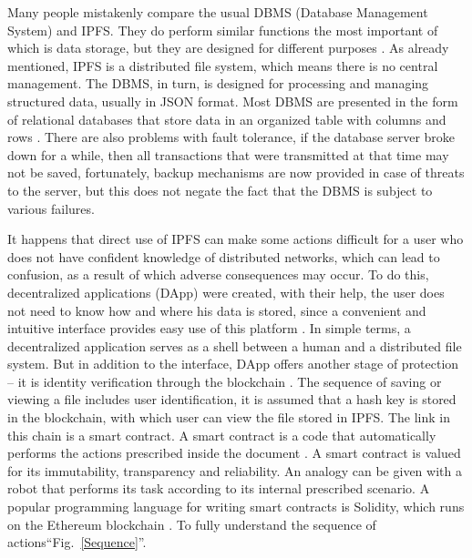 \documentclass[10pt,conference,a4paper]{IEEEtran_EDM}
\begin{document}
Many people mistakenly compare the usual DBMS (Database Management System) and IPFS.
They do perform similar functions the most important of which is data storage, but they are designed for different purposes \cite{Ruan}.
As already mentioned, IPFS is a distributed file system, which means there is no central management.
The DBMS, in turn, is designed for processing and managing structured data, usually in JSON format.
Most DBMS are presented in the form of relational databases that store data in an organized table with columns and rows \cite{Gillenson}.
There are also problems with fault tolerance, if the database server broke down for a while, then all transactions that were transmitted at that time may not be saved, fortunately, backup mechanisms are now provided in case of threats to the server, but this does not negate the fact that the DBMS is subject to various failures.

It happens that direct use of IPFS can make some actions difficult for a user who does not have confident knowledge of distributed networks, which can lead to confusion, as a result of which adverse consequences may occur.
To do this, decentralized applications (DApp) were created, with their help, the user does not need to know how and where his data is stored, since a convenient and intuitive interface provides easy use of this platform \cite{Infante}.
In simple terms, a decentralized application serves as a shell between a human and a distributed file system.
But in addition to the interface, DApp offers another stage of protection – it is identity verification through the blockchain \cite{Lin}.
The sequence of saving or viewing a file includes user identification, it is assumed that a hash key is stored in the blockchain, with which user can view the file stored in IPFS.
The link in this chain is a smart contract.
A smart contract is a code that automatically performs the actions prescribed inside the document \cite{Frolov}.
A smart contract is valued for its immutability, transparency and reliability.
An analogy can be given with a robot that performs its task according to its internal prescribed scenario.
A popular programming language for writing smart contracts is Solidity, which runs on the Ethereum blockchain \cite{Khan Nabeel}.
To fully understand the sequence of actions``Fig.~\ref{Sequence}''.
\end{document}
